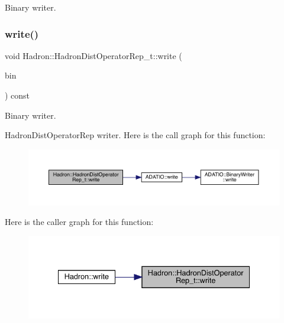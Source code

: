 Binary writer. 

\mbox{\label{classHadron_1_1HadronDistOperatorRep__t_a13c4b6d851e65136c55ccee152e72a12}} 
\subsubsection{\texorpdfstring{write()}{write()}\hspace{0.1cm}{\footnotesize\ttfamily [2/2]}}
{\footnotesize\ttfamily void Hadron\+::\+Hadron\+Dist\+Operator\+Rep\+\_\+t\+::write (\begin{DoxyParamCaption}\item[{\mbox{\hyperlink{classADATIO_1_1BinaryWriter}{A\+D\+A\+T\+I\+O\+::\+Binary\+Writer}} \&}]{bin }\end{DoxyParamCaption}) const}



Binary writer. 

Hadron\+Dist\+Operator\+Rep writer. Here is the call graph for this function\+:
\nopagebreak
\begin{figure}[H]
\begin{center}
\leavevmode
\includegraphics[width=350pt]{dd/de0/classHadron_1_1HadronDistOperatorRep__t_a13c4b6d851e65136c55ccee152e72a12_cgraph}
\end{center}
\end{figure}
Here is the caller graph for this function\+:
\nopagebreak
\begin{figure}[H]
\begin{center}
\leavevmode
\includegraphics[width=335pt]{dd/de0/classHadron_1_1HadronDistOperatorRep__t_a13c4b6d851e65136c55ccee152e72a12_icgraph}
\end{center}
\end{figure}


